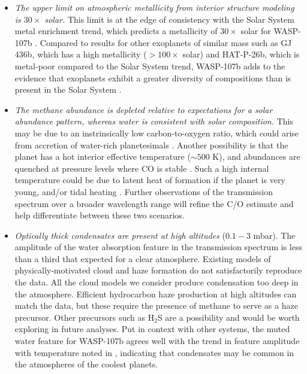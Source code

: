 \documentclass[twocolumn, trackchanges]{aastex61}
\begin{document}
\begin{itemize}
\item{\emph{The upper limit on atmospheric metallicity from interior structure modeling is $30\times$ solar.} This limit is at the edge of consistency with the Solar System metal enrichment trend, which predicts a metallicity of $30\times$ solar for WASP-107b \citep{kreidberg14b}.  Compared to results for other exoplanets of similar mass such as GJ 436b, which has a high metallicity ($>100\times$ solar) and HAT-P-26b, which is metal-poor compared to the Solar System trend, WASP-107b adds to the evidence that exoplanets exhibit a greater diversity of compositions than is present in the Solar System \citep{morley17, wakeford17}.}
\item{\emph{The methane abundance is depleted relative to expectations for a solar abundance pattern, whereas water is consistent with solar composition.} This may be due to an instrinsically low carbon-to-oxygen ratio, which could arise from accretion of water-rich planetesimals \citep{mordasini16, espinoza17}.  Another possibility is that the planet has a hot interior effective temperature ($\sim500$ K), and abundances are quenched at pressure levels where CO is stable \citep[as observed in some directly imaged planets;][]{skemer14, zahnle14}. Such a high internal temperature could be due to latent heat of formation if the planet is very young, and/or tidal heating \citep{fortney08, morley17}. Further observations of the transmission spectrum over a broader wavelength range will refine the C/O estimate and help differentiate between these two scenarios.} 
\item{\emph{Optically thick condensates are present at high altitudes} ($0.1 - 3$ mbar). The amplitude of the water absorption feature in the transmission spectrum is less than a third that expected for a clear atmosphere. Existing models of physically-motivated cloud and haze formation do not satisfactorily reproduce the data. All the cloud models we consider produce condensation too deep in the atmosphere. Efficient hydrocarbon haze production at high altitudes can match the data, but these require the presence of methane to serve as a haze precursor.  Other precursors such as H$_2$S are a possibility and would be worth exploring in future analyses. Put in context with other systems, the muted water feature for WASP-107b agrees well with the trend in feature amplitude with temperature noted in \cite{crossfield17}, indicating that condensates may be common in the atmospheres of the coolest planets.}
\end{itemize}
\end{document}

